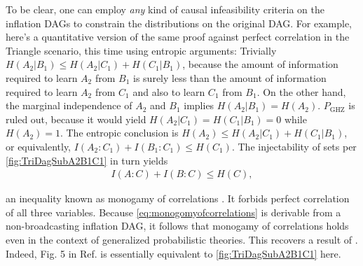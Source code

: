 To be clear, one can employ \emph{any} kind of causal infeasibility criteria on the inflation DAGs to constrain the distributions on the original DAG. For example, here's a quantitative version of the same proof against perfect correlation in the Triangle scenario, this time using entropic arguments: Trivially $H(A_2|B_1)\leq H(A_2|C_1)+H(C_1|B_1)$, because the amount of information required to learn $A_2$ from $B_1$ is surely less than the amount of information required to learn  $A_2$ from $C_1$ and also to learn $C_1$ from $B_1$. On the other hand, the marginal independence of $A_2$ and $B_1$ implies $H(A_2|B_1)=H(A_2)$. $P_{\text{GHZ}}$ is ruled out, because it would yield $H(A_2|C_1)=H(C_1|B_1)=0$ while $H(A_2)=1$. The entropic conclusion is $H(A_2)\leq H(A_2|C_1)+H(C_1|B_1)$, or equivalently, $I(A_2:C_1)+I(B_1:C_1)\leq H(C_1)$. The injectability of sets per \cref{fig:TriDagSubA2B1C1} in turn yields
\begin{align}\label{eq:monogomyofcorrelations}
I(A:C)+I(B:C)\leq H(C),
\end{align}

an inequality known as monogamy of correlations \cite{fritz2012bell}. It forbids perfect correlation of all three variables. Because \cref{eq:monogomyofcorrelations} is derivable from a non-broadcasting inflation DAG, it follows that monogamy of correlations holds even in the context of generalized probabilistic theories. This recovers a result of \citet[Cor. 24]{pusey2014gdag}. Indeed, Fig. 5 in Ref. \cite{pusey2014gdag} is essentially equivalent to \cref{fig:TriDagSubA2B1C1} here.


